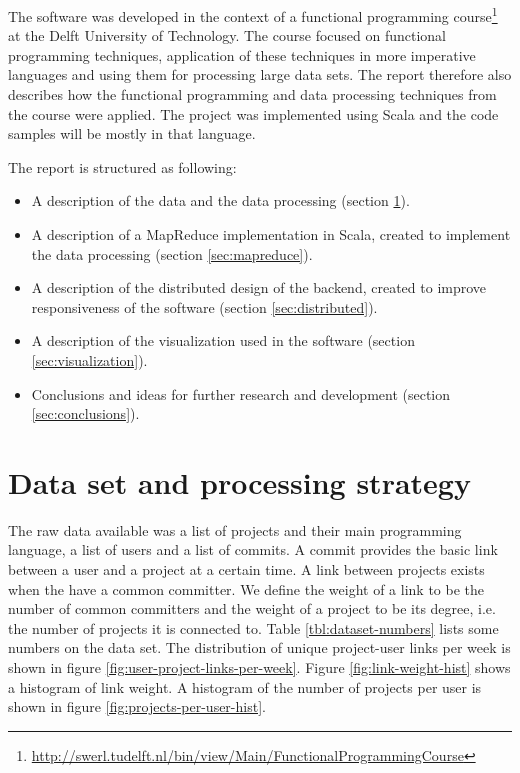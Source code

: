 \documentclass[10pt,a4paper]{article}
\begin{document}
The software was developed in the context of a functional programming course\footnote{\url{http://swerl.tudelft.nl/bin/view/Main/FunctionalProgrammingCourse}} at the Delft University of Technology. The course focused on functional programming techniques, application of these techniques in more imperative languages and using them for processing large data sets. The report therefore also describes how the functional programming and data processing techniques from the course were applied. The project was implemented using Scala and the code samples will be mostly in that language.

The report is structured as following:
\begin{itemize}
    \item A description of the data and the data processing (section \ref{sec:data}).
    \item A description of a MapReduce implementation in Scala, created to implement the data processing (section \ref{sec:mapreduce}).
    \item A description of the distributed design of the backend, created to improve responsiveness of the software (section \ref{sec:distributed}).
    \item A description of the visualization used in the software (section \ref{sec:visualization}).
    \item Conclusions and ideas for further research and development (section \ref{sec:conclusions}).
\end{itemize}

\section{Data set and processing strategy}\label{sec:data}

The raw data available was a list of projects and their main programming language, a list of users and a list of commits. A commit provides the basic link between a user and a project at a certain time. A link between projects exists when the have a common committer. We define the weight of a link to be the number of common committers and the weight of a project to be its degree, i.e. the number of projects it is connected to. Table \ref{tbl:dataset-numbers} lists some numbers on the data set. The distribution of unique project-user links per week is shown in figure \ref{fig:user-project-links-per-week}. Figure \ref{fig:link-weight-hist} shows a histogram of link weight. A histogram of the number of projects per user is shown in figure \ref{fig:projects-per-user-hist}.
\end{document}
